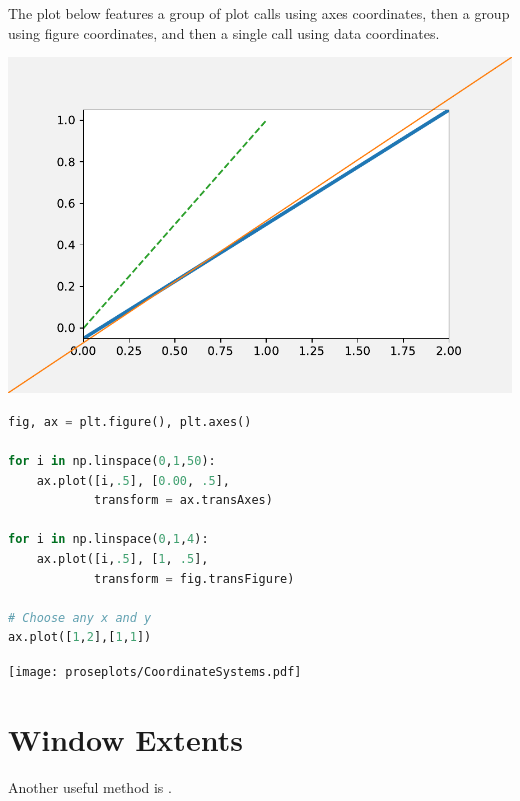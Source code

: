 The plot below features a group of plot calls using axes coordinates, then a group using figure coordinates, and then a single call using data coordinates. 


\begin{center}
    \includegraphics[width = .8\textwidth]{figures/proseplots/coords.pdf}
\end{center}



\begin{lstlisting}[language = Python]
fig, ax = plt.figure(), plt.axes()

for i in np.linspace(0,1,50):
    ax.plot([i,.5], [0.00, .5], 
            transform = ax.transAxes)

for i in np.linspace(0,1,4):
    ax.plot([i,.5], [1, .5], 
            transform = fig.transFigure)
    
# Choose any x and y
ax.plot([1,2],[1,1])
\end{lstlisting}

\begin{center}
    \texttt{[image: proseplots/CoordinateSystems.pdf]}
\end{center}


\section{Window Extents}

Another useful method is .